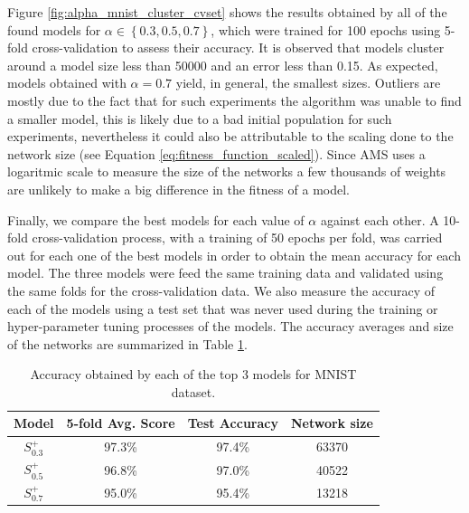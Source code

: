 \documentclass[journal]{IEEEtran}
\begin{document}
Figure \ref{fig:alpha_mnist_cluster_cvset} shows the results obtained by all of the found models for $\alpha \in \left\lbrace 0.3, 0.5, 0.7  \right\rbrace$, which were trained for 100 epochs using 5-fold cross-validation to assess their accuracy. It is observed that models cluster around a model size less than 50000 and an error less than 0.15. As expected, models obtained with $\alpha = 0.7$ yield, in general, the smallest sizes. Outliers are mostly due to the fact that for such experiments the algorithm was unable to find a smaller model, this is likely due to a bad initial population for such experiments, nevertheless it could also be attributable to the scaling done to the network size (see Equation  \ref{eq:fitness_function_scaled}). Since AMS uses a logaritmic scale to measure the size of the networks a few thousands of weights are unlikely to make a big difference in the fitness of a model. 

Finally, we compare the best models for each value of $\alpha$ against each other. A 10-fold cross-validation process, with a training of 50 epochs per fold, was carried out for each one of the best models in order to obtain the mean accuracy for each model. The three models were feed the same training data and validated using the same folds for the cross-validation data. We also measure the accuracy of each of the models using a test set that was never used during the training or hyper-parameter tuning processes of the models. The accuracy averages and size of the networks are summarized in Table \ref{table:avg_accuracies_mnist}. 

\begin{table}[!htb]
\begin{center}
\begin{tabular}{| c | c | c | c |}
\hline
Model & 5-fold Avg. Score & Test Accuracy & Network size\\
\hline
$S^+_{0.3}$ & 97.3\% & 97.4\% & 63370\\
$S^+_{0.5}$ & 96.8\% & 97.0\% & 40522\\
$S^+_{0.7}$ & 95.0\% & 95.4\% & 13218\\
\hline
\end{tabular}
\end{center}
\caption{Accuracy obtained by each of the top 3 models for MNIST dataset.}
\label{table:avg_accuracies_mnist}
\end{table}
\end{document}
